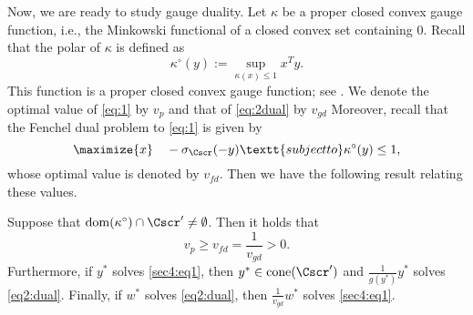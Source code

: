 \documentclass{siamltex}   %
\begin{document}
  Now, we are ready to study gauge duality. Let $\kappa$ be a proper closed convex gauge function, i.e., the Minkowski functional of
  a closed convex set containing $0$. Recall that the polar of $\kappa$ is defined as
  \[
  \kappa^\circ(y) := \sup_{\kappa(x)\le 1}x^Ty.
  \]
  This function is a proper closed convex gauge function; see \cite[Theorem~15.1]{Roc70}.
  We denote the optimal value of \eqref{eq:1} by $v_{p}$ and that of \eqref{eq:2dual} by $v_{gd}$
  Moreover, recall that the Fenchel dual problem to \eqref{eq:1} is given by
  \begin{equation}
    \label{sec4:eq1}
    \maximize{x} \quad -\sigma_{\Cscr}(-y) \textt{subject to} \kappa^\circ(y)\le 1,
  \end{equation}
  whose optimal value is denoted by $v_{fd}$. Then we have the following result relating these values.
  \begin{theorem}\label{sec4:thm1}
  Suppose that ${\rm dom}(\kappa^\circ)\cap \Cscr'\neq \emptyset$.
  Then it holds that
  \[
  v_p\ge v_{fd} = \frac{1}{v_{gd}} > 0.
  \]
  Furthermore, if $y^*$ solves \eqref{sec4:eq1}, then $y^*\in {\rm cone}(\Cscr')$
  and $\frac{1}{g(y^*)}y^*$ solves \eqref{eq2:dual}. Finally, if $w^*$ solves \eqref{eq2:dual}, then $\frac{1}{v_{gd}} w^*$ solves \eqref{sec4:eq1}.
  \end{theorem}
\end{document}
